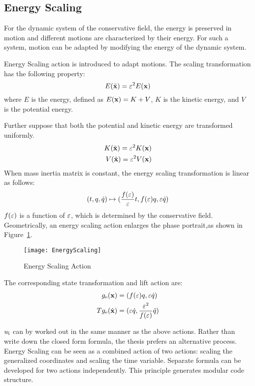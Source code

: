 \subsection*{Energy Scaling}
For the  dynamic system of the conservative field,
the energy is preserved in motion and different motions are characterized by their energy.
For such a system, motion can be adapted by modifying the energy of the dynamic system.

Energy Scaling action is introduced to adapt motions.
The scaling transformation has the following property:
\[
E(\tilde{\mathbf{x}})=\varepsilon^2 E(\mathbf{x})
\]
where $E$ is the energy, defined as $E(\mathbf{x})=K+V$,  $K$ is the kinetic energy, and $V$ is the potential energy.

Further suppose that both the potential and kinetic energy are transformed uniformly.
\begin{align}
K(\tilde{\mathbf{x}})=\varepsilon^2 K(\mathbf{x}) \nonumber\\
V(\tilde{\mathbf{x}})=\varepsilon^2 V(\mathbf{x}) \nonumber
\end{align}
When mass inertia matrix is constant,  the energy scaling transformation is linear as follows:
\[
(t,q,\dot{q} ) \mapsto ( \frac{f(\varepsilon)}{\varepsilon}t ,f(\varepsilon)q,\varepsilon\dot{q})
\]
$f(\varepsilon)$ is a function of $\varepsilon$, which is determined by the conservative field.
Geometrically, an energy scaling action enlarges the phase portrait,as shown in Figure~\ref{fig:gen}.
\begin{figure}[!htbp]
  \begin{center}
      \texttt{[image: EnergyScaling]}
    \caption{Energy Scaling Action}
    \label{fig:gen}
\end{center}
\end{figure}

The corresponding  state transformation and lift action are:
\begin{align}
g_{\mathrm{e}}(\mathbf{x})&=(f(\varepsilon) q,\varepsilon \dot{q}) \nonumber\\
Tg_{\mathrm{e}}(\dot{\mathbf{x}})&=(\varepsilon \dot{q},\frac{\varepsilon^2}{f(\varepsilon)}\ddot{q})
\end{align}

$u_{\mathrm{l}}$ can by worked out in the same manner as the above actions.
Rather than write down the closed form formula, the thesis prefers an alternative process.
Energy Scaling can be seen as a combined action of two actions: scaling the generalized coordinates and scaling the time variable.
Separate formula can be developed for two actions independently.
This principle generates modular code structure.




